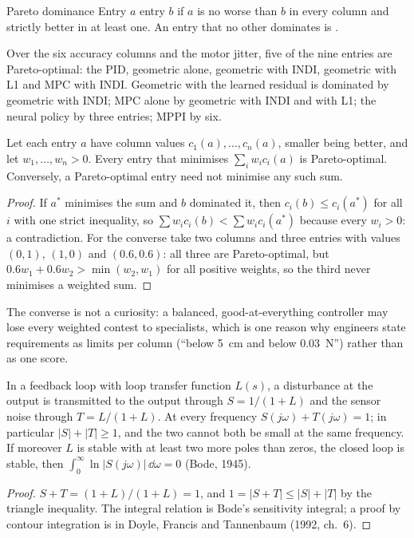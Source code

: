 \begin{definition}{Pareto dominance}
Entry $a$  entry $b$ if $a$ is no worse than $b$ in every column and strictly better in at least one. An entry that no other dominates is .
\end{definition}

Over the six accuracy columns and the motor jitter, five of the nine entries are Pareto-optimal: the PID, geometric alone, geometric with INDI, geometric with L1 and MPC with INDI. Geometric with the learned residual is dominated by geometric with INDI; MPC alone by geometric with INDI and with L1; the neural policy by three entries; MPPI by six.

\begin{theorem}
\label{thm:arena-pareto}
Let each entry $a$ have column values $c_1(a), \dots, c_n(a)$, smaller being better, and let $w_1, \dots, w_n > 0$. Every entry that minimises $\sum_iw_ic_i(a)$ is Pareto-optimal. Conversely, a Pareto-optimal entry need not minimise any such sum.
\end{theorem}
\begin{proof}
If $a^*$ minimises the sum and $b$ dominated it, then $c_i(b) \le c_i(a^*)$ for all $i$ with one strict inequality, so $\sum w_ic_i(b) < \sum w_ic_i(a^*)$ because every $w_i > 0$: a contradiction. For the converse take two columns and three entries with values $(0, 1)$, $(1, 0)$ and $(0.6, 0.6)$: all three are Pareto-optimal, but $0.6w_1 + 0.6w_2 > \min(w_2, w_1)$ for all positive weights, so the third never minimises a weighted sum.
\end{proof}

The converse is not a curiosity: a balanced, good-at-everything controller may lose every weighted contest to specialists, which is one reason why engineers state requirements as limits per column (\enquote{below \SI{5}{cm} and below \SI{0.03}{N}}) rather than as one score.

\begin{theorem}
\label{thm:arena-st}
In a feedback loop with loop transfer function $L(s)$, a disturbance at the output is transmitted to the output through $S = 1/(1 + L)$ and the sensor noise through $T = L/(1 + L)$. At every frequency $S(j\omega) + T(j\omega) = 1$; in particular $|S| + |T| \ge 1$, and the two cannot both be small at the same frequency. If moreover $L$ is stable with at least two more poles than zeros, the closed loop is stable, then $\int_0^\infty\ln|S(j\omega)|\,\dd\omega = 0$ (Bode, 1945).
\end{theorem}
\begin{proof}
$S + T = (1 + L)/(1 + L) = 1$, and $1 = |S + T| \le |S| + |T|$ by the triangle inequality. The integral relation is Bode's sensitivity integral; a proof by contour integration is in Doyle, Francis and Tannenbaum (1992, ch.~6).
\end{proof}

